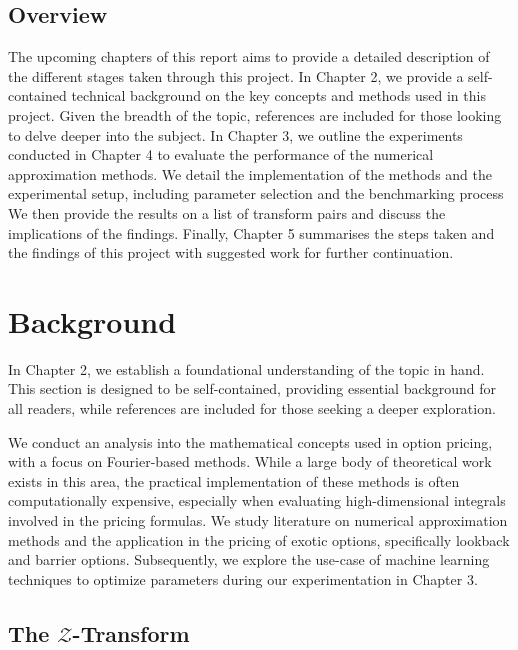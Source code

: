 \documentclass[a4paper]{report}
\begin{document}
\section{Overview}
The upcoming chapters of this report aims to provide a detailed description of the different stages taken through this project. In Chapter 2, we provide a self-contained technical background on the key concepts and methods used in this project. Given the breadth of the topic, references are included for those looking to delve deeper into the subject. In Chapter 3, we outline the experiments conducted in Chapter 4 to evaluate the performance of the numerical approximation methods. We detail the implementation of the methods and the experimental setup, including parameter selection and the benchmarking process We then provide the results on a list of transform pairs and discuss the implications of the findings. Finally, Chapter 5 summarises the steps taken and the findings of this project with suggested work for further continuation. 

\chapter{Background}

In Chapter 2, we establish a foundational understanding of the topic in hand. This section is designed to be self-contained, providing essential background for all readers, while references are included for those seeking a deeper exploration.

We conduct an analysis into the mathematical concepts used in option pricing, with a focus on Fourier-based methods. While a large body of theoretical work exists in this area, the practical implementation of these methods is often computationally expensive, especially when evaluating high-dimensional integrals involved in the pricing formulas. We study literature on numerical approximation methods and the application in the pricing of exotic options, specifically lookback and barrier options. Subsequently, we explore the use-case of machine learning techniques to optimize parameters during our experimentation in Chapter 3.

\section{The \texorpdfstring{$\mathcal{Z}$}{Lg}-Transform}\label{z_transform}
\end{document}
